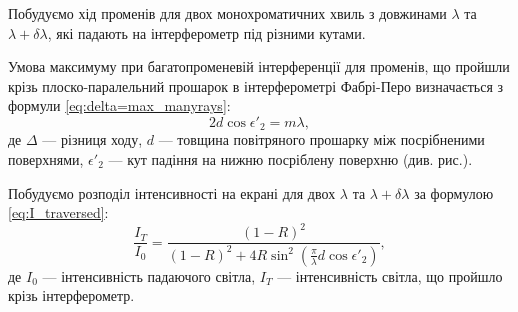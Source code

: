 
\begin{solutionexample}


    Побудуємо хід променів для двох монохроматичних хвиль з довжинами $\lambda$ та $\lambda + \delta\lambda$, які падають на інтерферометр під різними кутами.%


    \begin{center}
        
    \end{center}

    Умова максимуму при багатопроменевій інтерференції для променів, що пройшли крізь плоско-паралельний прошарок в інтерферометрі Фабрі-Перо визначається з формули \eqref{eq:delta=max_manyrays}:
    \begin{equation}
        2d\cos\epsilon'_2 = m\lambda,
    \end{equation}
    де $\Delta$ --- різниця ходу, $d$ --- товщина повітряного прошарку між посрібненими поверхнями, $\epsilon'_2$ --- кут падіння на нижню посріблену поверхню (див. рис.).

    Побудуємо розподіл інтенсивності на екрані для двох $\lambda$ та $\lambda + \delta\lambda$ за формулою \eqref{eq:I_traversed}:
    \begin{equation*}
        \frac{I_T}{I_0} = \frac{(1-R)^2}{(1-R)^2 + 4R\sin^2\left( \frac{\pi}{\lambda} d\cos\epsilon'_2 \right) },
    \end{equation*}
    де $I_0$ --- інтенсивність падаючого світла, $I_T$ --- інтенсивність світла, що пройшло крізь інтерферометр.


\end{solutionexample}

